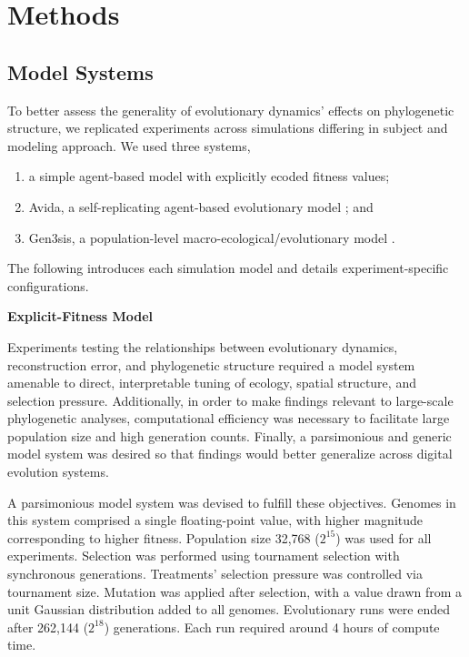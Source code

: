 \section{Methods}
\label{sec:methods}

\subsection{Model Systems}

To better assess the generality of evolutionary dynamics' effects on phylogenetic structure, we replicated experiments across simulations differing in subject and modeling approach.
We used three systems,
\begin{enumerate}
\item a simple agent-based model with explicitly ecoded fitness values;
\item Avida, a self-replicating agent-based evolutionary model \citep{ofria2004avida}; and
\item Gen3sis, a population-level macro-ecological/evolutionary model \citep{hagen2021gen3sis}.
\end{enumerate}

The following introduces each simulation model and details experiment-specific configurations.

\textbf{Explicit-Fitness Model}

Experiments testing the relationships between evolutionary dynamics, reconstruction error, and phylogenetic structure required a model system amenable to direct, interpretable tuning of ecology, spatial structure, and selection pressure.
Additionally, in order to make findings relevant to large-scale phylogenetic analyses, computational efficiency was necessary to facilitate large population size and high generation counts.
Finally, a parsimonious and generic model system was desired so that findings would better generalize across digital evolution systems.

A parsimonious model system was devised to fulfill these objectives.
Genomes in this system comprised a single floating-point value, with higher magnitude corresponding to higher fitness.
Population size 32,768 ($2^{15}$) was used for all experiments.
Selection was performed using tournament selection with synchronous generations.
Treatments' selection pressure was controlled via tournament size.
Mutation was applied after selection, with a value drawn from a unit Gaussian distribution added to all genomes.
Evolutionary runs were ended after 262,144 ($2^{18}$) generations.
Each run required around 4 hours of compute time.

